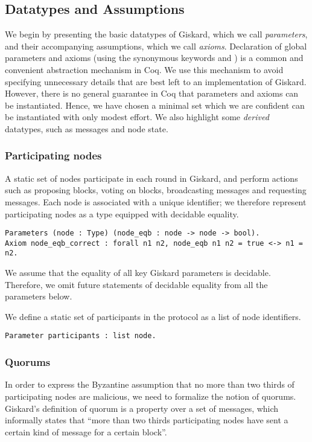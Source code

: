 \documentclass{easychair}
\begin{document}
\subsection{Datatypes and Assumptions}
We begin by presenting the basic datatypes of Giskard, which we call \emph{parameters}, and their accompanying assumptions, which we call \emph{axioms}. Declaration of global parameters and axioms (using the synonymous keywords  and ) is a common and convenient abstraction mechanism in Coq. We use this mechanism to avoid specifying unnecessary details that are best left to an implementation of Giskard. However, there is no general guarantee in Coq that parameters and axioms can be instantiated. Hence, we have chosen a minimal set which we are confident can be instantiated with only modest effort. We also highlight some \emph{derived} datatypes, such as messages and node state.

\subsubsection{Participating nodes} 
A static set of nodes participate in each round in Giskard, and perform actions such as proposing blocks, voting on blocks, broadcasting messages and requesting messages.
Each node is associated with a unique identifier; we therefore represent participating nodes as a type equipped with decidable equality.

\begin{lstlisting}[language=Coq]
Parameters (node : Type) (node_eqb : node -> node -> bool).
Axiom node_eqb_correct : forall n1 n2, node_eqb n1 n2 = true <-> n1 = n2.
\end{lstlisting}

We assume that the equality of all key Giskard parameters is decidable. Therefore, we omit future statements of decidable equality from all the parameters below. 

We define a static set of participants in the protocol as a list of node identifiers.
\begin{lstlisting}[language=Coq]
Parameter participants : list node. 
\end{lstlisting}

\subsubsection{Quorums} 
In order to express the Byzantine assumption that no more than two thirds of participating nodes are malicious, we need to formalize the notion of quorums. Giskard's definition of quorum is a property over a set of messages, which informally states that ``more than two thirds participating nodes have sent a certain kind of message for a certain block''. 
\end{document}

